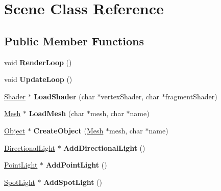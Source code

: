 \hypertarget{class_scene}{}\section{Scene Class Reference}
\label{class_scene}
\subsection*{Public Member Functions}
\begin{DoxyCompactItemize}
\item 
\mbox{\label{class_scene_a71708279f69885e838e288c6689ddd1c}} 
void {\bfseries Render\+Loop} ()
\item 
\mbox{\label{class_scene_ab0293e9c900f18ce4ca26621d4b7ddfe}} 
void {\bfseries Update\+Loop} ()
\item 
\mbox{\label{class_scene_a6f0f7af3d07acbee2d6864c3ded98351}} 
\hyperlink{class_shader}{Shader} $\ast$ {\bfseries Load\+Shader} (char $\ast$vertex\+Shader, char $\ast$fragment\+Shader)
\item 
\mbox{\label{class_scene_ab729ec633aed779aedb3cd43058da683}} 
\hyperlink{class_mesh}{Mesh} $\ast$ {\bfseries Load\+Mesh} (char $\ast$mesh, char $\ast$name)
\item 
\mbox{\label{class_scene_adfdea29bf0ed9107c28f99fb8ebe34d1}} 
\hyperlink{class_object}{Object} $\ast$ {\bfseries Create\+Object} (\hyperlink{class_mesh}{Mesh} $\ast$mesh, char $\ast$name)
\item 
\mbox{\label{class_scene_a8ba56754e230d7a99736c5232bd912ea}} 
\hyperlink{class_directional_light}{Directional\+Light} $\ast$ {\bfseries Add\+Directional\+Light} ()
\item 
\mbox{\label{class_scene_ac33b9cc536096a447892f524802dd2ec}} 
\hyperlink{class_point_light}{Point\+Light} $\ast$ {\bfseries Add\+Point\+Light} ()
\item 
\mbox{\label{class_scene_a5086a9e37b94c2dfb30dfacbee668c79}} 
\hyperlink{class_spot_light}{Spot\+Light} $\ast$ {\bfseries Add\+Spot\+Light} ()
\end{DoxyCompactItemize}
